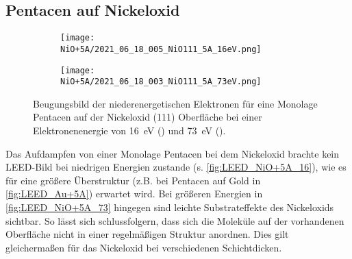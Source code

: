         \subsection{Pentacen auf Nickeloxid}
            \begin{figure}
                \centering
                \begin{subfigure}[t]{0.48\textwidth}
                    \centering
                    \texttt{[image: NiO+5A/2021\_06\_18\_005\_NiO111\_5A\_16eV.png]}
                    \subcaption{}
                    \label{fig:LEED_NiO+5A_16}
                \end{subfigure}
                \begin{subfigure}[t]{0.48\textwidth}
                    \centering
                    \texttt{[image: NiO+5A/2021\_06\_18\_003\_NiO111\_5A\_73eV.png]}
                    \subcaption{}
                    \label{fig:LEED_NiO+5A_73}
                \end{subfigure}
                \caption{Beugungsbild der niederenergetischen Elektronen für eine Monolage Pentacen auf der Nickeloxid (111) Oberfläche bei einer Elektronenenergie von \SI{16}{\electronvolt} () und \SI{73}{\electronvolt} ().}
                \label{fig:LEED_NiO+5A}
            \end{figure}
            Das Aufdampfen von einer Monolage Pentacen bei dem Nickeloxid brachte kein LEED-Bild bei niedrigen Energien zustande (s. \autoref{fig:LEED_NiO+5A_16}), wie es für eine größere Überstruktur (z.B. bei Pentacen auf Gold in \autoref{fig:LEED_Au+5A}) erwartet wird.
            Bei größeren Energien in \autoref{fig:LEED_NiO+5A_73} hingegen sind leichte Substrateffekte des Nickeloxids sichtbar.
            So lässt sich schlussfolgern, dass sich die Moleküle auf der vorhandenen Oberfläche nicht in einer regelmäßigen Struktur anordnen.
            Dies gilt gleichermaßen für das Nickeloxid bei verschiedenen Schichtdicken.

